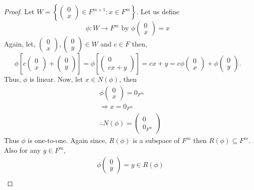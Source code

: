 \documentclass[12pt, a4paper]{article}
\theoremstyle{definition}
\theoremstyle{remark}
\begin{document}
\begin{proof}
Let $W = \left\{ \begin{pmatrix} 0 \\ x \end{pmatrix} \in F^{m+1} : x \in F^m \right\}$. Let us define
\[
\phi : W \to F^m \text{ by } \phi \begin{pmatrix} 0 \\ x \end{pmatrix} = x
\]
Again, let, $\begin{pmatrix} 0 \\ x \end{pmatrix}, \begin{pmatrix} 0 \\ y \end{pmatrix} \in W$ and $c \in F$ then,
\[
\phi \left[ c \begin{pmatrix} 0 \\ x \end{pmatrix} + \begin{pmatrix} 0 \\ y \end{pmatrix} \right] = \phi \left[ \begin{pmatrix} 0 \\ cx + y \end{pmatrix} \right] = cx + y = c \phi \begin{pmatrix} 0 \\ x \end{pmatrix} + \phi \begin{pmatrix} 0 \\ y \end{pmatrix}.
\]
Thus, $\phi$ is linear. Now, let $x \in N(\phi)$, then
\begin{align*}
& \phi \begin{pmatrix} 0 \\ x \end{pmatrix} = 0_{F^m} \\
& \Rightarrow x = 0_{F^m} \\
& \therefore N(\phi) = \begin{pmatrix} 0 \\ 0_{F^m} \end{pmatrix}
\end{align*}
Thus $\phi$ is one-to-one. Again since, $R(\phi)$ is a subspace of $F^m$ then $R(\phi) \subseteq F^m$. Also for any $y \in F^m$,
\begin{align*}
& \phi \begin{pmatrix} 0 \\ y \end{pmatrix} = y \in R(\phi) \\

\end{align*}
\end{proof}
\end{document}
